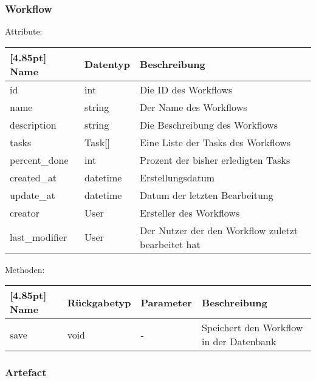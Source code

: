         \subsubsection{Workflow}
        
        Attribute:
		\begin{center}
        	\renewcommand{\arraystretch}{1.5}
            \setlength\tabcolsep{5pt}
        	\begin{tabularx}{\textwidth}{|l|l|X|}
        		\hline
                \rowcolor[gray]{0.75}[4.85pt]            		
        	    Name & Datentyp & Beschreibung \\ \hline
        	    id & int & Die ID des Workflows \\ \hline
        	    name & string & Der Name des Workflows \\ \hline
        	    description & string & Die Beschreibung des Workflows \\ \hline
        	    tasks & Task[] & Eine Liste der Tasks des Workflows \\ \hline
        	    percent_done & int & Prozent der bisher erledigten Tasks \\ \hline
        	    created_at & datetime & Erstellungsdatum \\ \hline
        	    update_at & datetime & Datum der letzten Bearbeitung\\ \hline
        	    creator & User & Ersteller des Workflows \\ \hline
        	    last_modifier & User & Der Nutzer der den Workflow zuletzt bearbeitet hat \\ \hline
        	\end{tabularx}
        \end{center}
		
		Methoden:
		\begin{center}
		    \setlength\tabcolsep{5pt}
        	\renewcommand{\arraystretch}{1.5}
            	\begin{tabularx}{\textwidth}{|l|l|l|X|}
            	\hline
            	\rowcolor[gray]{0.75}[4.85pt]
        		Name & Rückgabetyp & Parameter & Beschreibung \\ \hline 
                save & void & - & Speichert den Workflow in der Datenbank \\ \hline
            	\end{tabularx}
		\end{center}
    	
    	\subsubsection{Artefact}
    	
